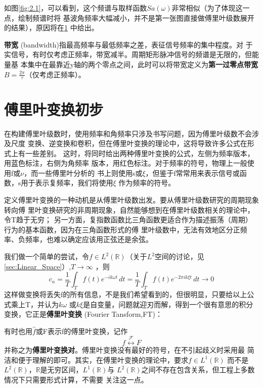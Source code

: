 \documentclass{ctexbook}
\begin{document}
如图\ref{fig:2.1}，可以看到，这个频谱与取样函数$Sa(\omega)$非常相似（为了体现这一点，绘制频谱时将
基波角频率大幅减小，并不是第一张图直接做傅里叶级数展开的结果），原因将在\ref{sec:Fourier}
中给出。

\textbf{带宽} (bandwidth)指最高频率与最低频率之差，表征信号频率的集中程度。对
于实信号，有时仅考虑正频率，带宽减半。周期矩形脉冲信号的频谱是无限的，但能量基
本集中在最靠近y轴的两个零点之间，此时可以将带宽定义为\textbf{第一过零点带宽}
$B=\frac{2\pi}{\tau}$（仅考虑正频率）。

\section{傅里叶变换初步}\label{sec:Fourier}
在构建傅里叶级数时，使用频率和角频率只涉及书写问题，因为傅里叶级数不会涉及尺度
变换、逆变换和卷积，但在傅里叶变换的理论中，这将导致许多公式在形式上有一些差别。
这时，将同时给出两种傅里叶变换的公式，左侧为频率版本，用蓝色标注，右侧为角频率
版本，用红色标注。对于频率的符号，物理上一般使用f或$\nu $，而一些傅里叶分析的
书上则使用s或$\xi$，但鉴于f常常用来表示信号或函数，s用于表示复频率，我们将使用$\xi$
作为频率的符号。

定义傅里叶变换的一种动机是从傅里叶级数出发。要从傅里叶级数研究的周期现象转向傅
里叶变换研究的非周期现象，自然能够想到在傅里叶级数相关的理论中，令T趋于无穷；
另一方面，复指数函数比三角函数更适合作为描述振荡（周期）行为的基本函数，因为在三角函数形式的傅
里叶级数中，无法有效地区分正频率、负频率，也难以确定应该用正弦还是余弦。

我们做一个简单的尝试，令$f\in L^2(\mathbb{R})$（关于$L^2$空间的讨论，见\ref{sec:Linear_Space}）,$T\to \infty$
，则\[c_n=\frac{1}{T}\int_{T}f(t)e^{-ik\omega t}\,dt=\frac{1}{T}\int_{T}f(t)e^{-2\pi ik\xi t}\,dt\to 0\]
这样做变换将丢失f的所有信息，不是我们希望看到的，但很明显，只要给以上公式乘上T，并认为$k\omega$
或$k\xi$是自变量，问题就迎刃而解，得到一个很有意思的积分变换，它正是\textbf{傅里叶变换} (Fourier Tansform,FT)：

有时也用$\hat{f}$或F表示f的傅里叶变换，记作
\[f\overset{\mathcal{F} }{\longleftrightarrow}F\]
并称之为\textbf{傅里叶变换对}。傅里叶变换没有最好的符号，在不引起歧义时采用最
简洁和便于理解的即可。其实，在傅里叶变换的理论中，要求$f\in L^1(\mathbb{R})$
而不是$L^2(\mathbb{R})$，$\mathbb{R}$是无穷区间，$L^1(\mathbb{R})$与
$L^2(\mathbb{R})$之间不存在包含关系，但工程上多数情况下只需要形式计算，不需要
关注这一点。
\end{document}
